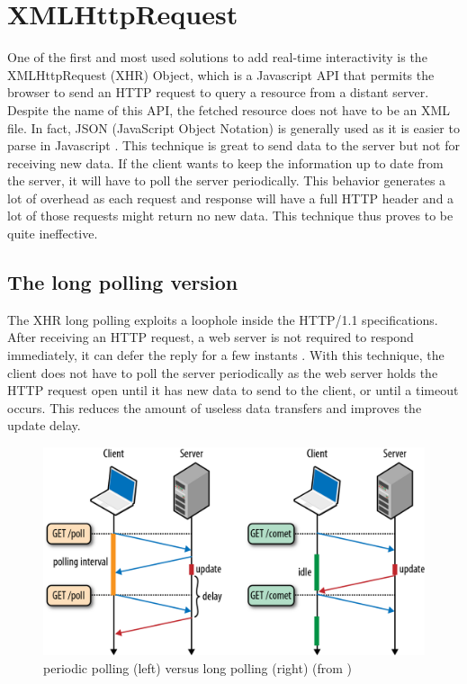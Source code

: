 \documentclass[10pt,journal,compsoc]{IEEEtran}
\begin{document}
\section{XMLHttpRequest}
\label{XHR}
One of the first and most used solutions to add real-time interactivity is the XMLHttpRequest (XHR) Object, which is a Javascript API that permits the browser to send an HTTP request to query a resource from a distant server.
Despite the name of this API, the fetched resource does not have to be an XML file.
In fact, JSON (JavaScript Object Notation) is generally used as it is easier to parse in Javascript \cite{collinalatency}.
This technique is great to send data to the server but not for receiving new data.
If the client wants to keep the information up to date from the server, it will have to poll the server periodically.
This behavior generates a lot of overhead as each request and response will have a full HTTP header and a lot of those requests might return no new data. This technique thus proves to be quite ineffective.

\subsection{The long polling version}

The XHR long polling exploits a loophole inside the \mbox{HTTP/1.1} specifications.
After receiving an HTTP request, a web server is not required to respond immediately, it can defer the reply for a few instants \cite{collinalatency}.
With this technique, the client does not have to poll the server periodically as the web server holds the HTTP request open until it has new data to send to the client, or until a timeout occurs.
This reduces the amount of useless data transfers and improves the update delay.

\begin{figure}[!ht]
  \centering
  \includegraphics[width=\linewidth]{poll_vs_lpoll}
  \caption{periodic polling (left) versus long polling (right) (from \cite{HighPerfBrowserNetworking:polling})}
  \label{poll_vs_lpoll}
\end{figure}
\end{document}
